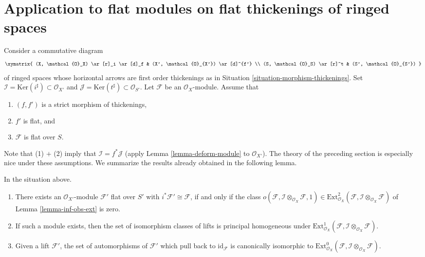 \section{Application to flat modules on flat thickenings of ringed spaces}
\label{section-flat}

\noindent
Consider a commutative diagram
$$
\xymatrix{
(X, \mathcal{O}_X) \ar[r]_i \ar[d]_f & (X', \mathcal{O}_{X'}) \ar[d]^{f'} \\
(S, \mathcal{O}_S) \ar[r]^t & (S', \mathcal{O}_{S'})
}
$$
of ringed spaces whose horizontal arrows are first order thickenings as in
Situation \ref{situation-morphism-thickenings}. Set
$\mathcal{I} = \text{Ker}(i^\sharp) \subset \mathcal{O}_{X'}$ and
$\mathcal{J} = \text{Ker}(t^\sharp) \subset \mathcal{O}_{S'}$.
Let $\mathcal{F}$ be an $\mathcal{O}_X$-module. Assume that
\begin{enumerate}
\item $(f, f')$ is a strict morphism of thickenings,
\item $f'$ is flat, and
\item $\mathcal{F}$ is flat over $S$.
\end{enumerate}
Note that (1) $+$ (2) imply that $\mathcal{I} = f^*\mathcal{J}$
(apply Lemma \ref{lemma-deform-module} to $\mathcal{O}_{X'}$).
The theory of the preceding section is especially nice
under these assumptions. We summarize the results already obtained
in the following lemma.

\begin{lemma}
\label{lemma-flat}
In the situation above.
\begin{enumerate}
\item There exists an $\mathcal{O}_{X'}$-module $\mathcal{F}'$ flat over
$S'$ with $i^*\mathcal{F}' \cong \mathcal{F}$, if and only if
the class $o(\mathcal{F}, \mathcal{I} \otimes_{\mathcal{O}_X} \mathcal{F}, 1)
\in \text{Ext}^2_{\mathcal{O}_X}(
\mathcal{F}, \mathcal{I} \otimes_{\mathcal{O}_X} \mathcal{F})$
of Lemma \ref{lemma-inf-obs-ext} is zero.
\item If such a module exists, then the set of isomorphism classes
of lifts is principal homogeneous under
$\text{Ext}^1_{\mathcal{O}_X}(
\mathcal{F}, \mathcal{I} \otimes_{\mathcal{O}_X} \mathcal{F})$.
\item Given a lift $\mathcal{F}'$, the set of automorphisms of
$\mathcal{F}'$ which pull back to $\text{id}_\mathcal{F}$ is canonically
isomorphic to $\text{Ext}^0_{\mathcal{O}_X}(
\mathcal{F}, \mathcal{I} \otimes_{\mathcal{O}_X} \mathcal{F})$.
\end{enumerate}
\end{lemma}

